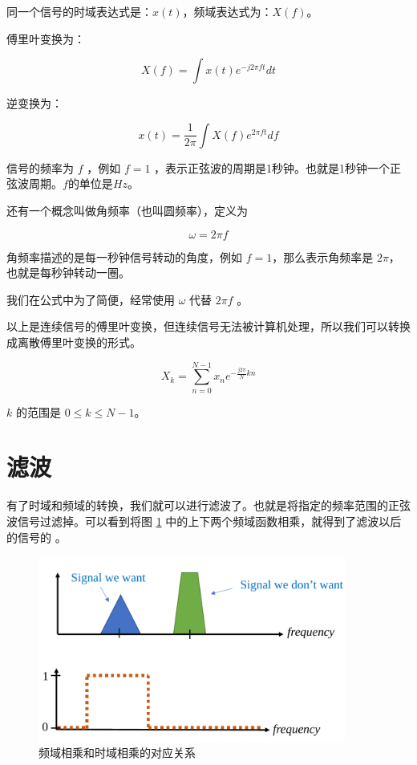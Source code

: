 \documentclass[lang=cn,newtx,10pt,scheme=chinese]{elegantbook}
\begin{document}
同一个信号的时域表达式是：$x(t)$，频域表达式为：$X(f)$。

傅里叶变换为：

$$
X(f) = \int{x(t)e^{-j 2 \pi f t}}dt
$$

逆变换为：

$$
x(t) = \frac{1}{2\pi}\int X(f)e^{2\pi ft}df
$$

信号的频率为 $f$ ，例如 $f=1$ ，表示正弦波的周期是1秒钟。也就是1秒钟一个正弦波周期。$f$的单位是$Hz$。

还有一个概念叫做角频率（也叫圆频率），定义为

$$
\omega = 2\pi f
$$

角频率描述的是每一秒钟信号转动的角度，例如 $f=1$，那么表示角频率是 $2\pi$，也就是每秒钟转动一圈。

我们在公式中为了简便，经常使用 $\omega$ 代替 $2\pi f$ 。

以上是连续信号的傅里叶变换，但连续信号无法被计算机处理，所以我们可以转换成离散傅里叶变换的形式。

$$
X_k = \sum_{n=0}^{N-1}x_n e^{-\frac{j2\pi}{N}kn}
$$

$k$ 的范围是 $0 \leq k \leq N-1$。

\section{滤波}

有了时域和频域的转换，我们就可以进行滤波了。也就是将指定的频率范围的正弦波信号过滤掉。可以看到将图 \ref{fig:filter} 中的上下两个频域函数相乘，就得到了滤波以后的信号的  。

\begin{figure}[!htb]
\centering
\includegraphics[width=0.9\textwidth]{filter.pdf}
\caption{频域相乘和时域相乘的对应关系}
\label{fig:filter}
\end{figure}
\end{document}
